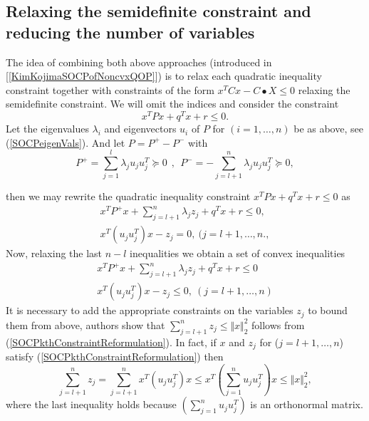\documentclass[12pt]{book}
\theoremstyle{definition}
\begin{document}


\subsection{Relaxing the semidefinite constraint and reducing the number of variables}
\label{SubsectionSOCPrelaxInOriginalVariable}

The idea of combining both above approaches (introduced in [\ref{KimKojimaSOCPofNoncvxQOP}]) is to relax each 
quadratic inequality constraint together with constraints of the form $x^TCx-C\bullet X \leq 0$ relaxing the semidefinite constraint. We will omit the indices and consider the constraint
\begin{equation}
\label{SOCPsingleQconst}
x^TPx + q^Tx + r\leq 0.
\end{equation}
Let the eigenvalues $\lambda_i$ and eigenvectors $u_i$ of $P$ for $(i = 1,\dots ,n)$ be as above, see (\ref{SOCPeigenVals}). And let $ P = P^+ - P^-$ with 
\begin{equation*}
P^+ = \sum_{j = 1}^{l}\lambda_j u_ju_j^T\succeq 0 \ \ , \ \ P^-  = -\sum_{j = l+1}^{n}\lambda_j u_ju_j^T\succeq 0,
\end{equation*}

then we may rewrite the quadratic inequality constraint $x^TPx + q^Tx + r \leq 0$ as 
\begin{equation}
\begin{array}{l}
\label{SOCPkthConstraintReformulation}
x^TP^+x + \sum_{j = l + 1}^n \lambda_j z_j + q^Tx + r \leq 0, \\
x^T(u_ju_j^T)x - z_j = 0, \ ( j= l+1, \dots ,n., 
\end{array}
\end{equation}
Now, relaxing the last $n-l$ inequalities we obtain a set of convex inequalities 
\begin{equation}
\begin{array}{l}
\label{SOCPrelax2}
x^TP^+x + \sum_{j = l + 1}^n \lambda_j z_j + q^Tx + r \leq 0 \\
x^T(u_ju_j^T)x - z_j \leq 0, \ ( j= l+1, \dots ,n) 
\end{array}
\end{equation}
It is necessary to add the appropriate constraints on the variables $z_j$ to bound them from above, authors 
show that $\sum_{j=l+1}^n z_j \leq \Vert x\Vert_2^2$ follows from (\ref{SOCPkthConstraintReformulation}). 
In fact, if $x$ and $z_j$ for ($j = l+1,\dots ,n$) satisfy (\ref{SOCPkthConstraintReformulation})
then 
\begin{equation*}
\sum_{j=l+1}^n z_j = \sum_{j=l+1}^nx^T(u_ju_j^T)x \leq  x^T \left(\sum_{j=1}^nu_ju_j^T\right)x \leq \Vert x\Vert_2^2,
\end{equation*}
where the last inequality holds because $\left(\sum_{j=1}^nu_ju_j^T\right)$ is an orthonormal matrix.
\end{document}
